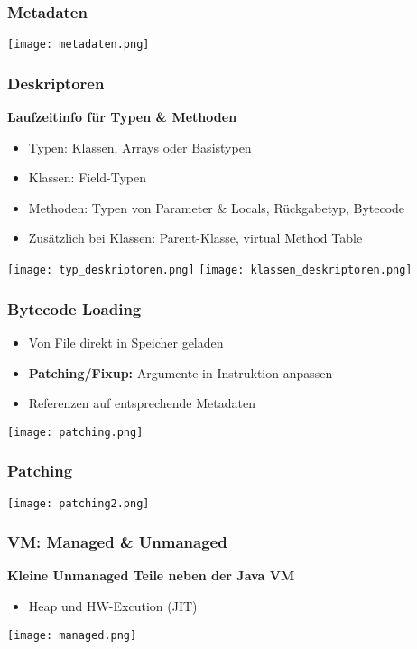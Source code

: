 \subsubsection{Metadaten}
\texttt{[image: metadaten.png]}

\subsubsection{Deskriptoren}
\textbf{Laufzeitinfo für Typen \& Methoden}
\begin{itemize}
    \item Typen: Klassen, Arrays oder Basistypen
    \item Klassen: Field-Typen
    \item Methoden: Typen von Parameter \& Locals, Rückgabetyp, Bytecode
    \item Zusätzlich bei Klassen: Parent-Klasse, virtual Method Table
\end{itemize}
\vspace{0.5cm}
\texttt{[image: typ\_deskriptoren.png]}
\texttt{[image: klassen\_deskriptoren.png]}

\subsubsection{Bytecode Loading}
\begin{itemize}
    \item Von File direkt in Speicher geladen
    \item \textbf{Patching/Fixup:} Argumente in Instruktion anpassen
    \item Referenzen auf entsprechende Metadaten
\end{itemize}
\texttt{[image: patching.png]}
\subsubsection{Patching}
\texttt{[image: patching2.png]}

\subsubsection{VM: Managed \& Unmanaged}
\textbf{Kleine Unmanaged Teile neben der Java VM}
\begin{itemize}
    \item Heap und HW-Excution (JIT)
\end{itemize}
\texttt{[image: managed.png]}

